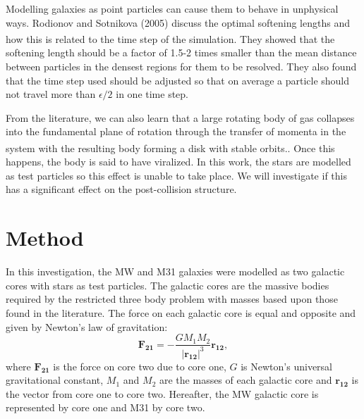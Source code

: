\documentclass[10pt, twocolumn]{revtex4}    %
\begin{document}
Modelling galaxies as point particles can cause them to behave in unphysical ways. Rodionov and Sotnikova (2005) discuss the optimal softening lengths and how this is related to the time step of the simulation.\textsuperscript{\cite{RodionovOptimalChoiceSoftening2005}} They showed that the softening length should be a factor of 1.5-2 times smaller than the mean distance between particles in the densest regions for them to be resolved. They also found that the time step used should be adjusted so that on average a particle should not travel more than $\epsilon/2$ in one time step.

From the literature, we can also learn that a large rotating body of gas collapses into the fundamental plane of rotation through the transfer of momenta in the system with the resulting body forming a disk with stable orbits.\textsuperscript{\cite{EggenEvidencemotionsold1962}}. Once this happens, the body is said to have viralized. In this work, the stars are modelled as test particles so this effect is unable to take place. We will investigate if this has a significant effect on the post-collision structure.
%

\section{Method}

In this investigation, the MW and M31 galaxies were modelled as two galactic cores with stars as test particles. The galactic cores are the massive bodies required by the restricted three body problem with masses based upon those found in the literature. The force on each galactic core is equal and opposite and given by Newton's law of gravitation:
\begin{equation}
\pmb{F_{21}} = -\frac{GM_{1}M_{2}}{|\pmb{r_{12}}|^3} \pmb{r_{12}},
\label{force_eq}
\end{equation}
where $\pmb{F_{21}}$ is the force on core two due to core one, $G$ is Newton's universal gravitational constant, $M_{1}$ and $M_{2}$ are the masses of each galactic core and $\pmb{r_{12}}$ is the vector from core one to core two. Hereafter, the MW galactic core is represented by core one and M31 by core two.
\end{document}
